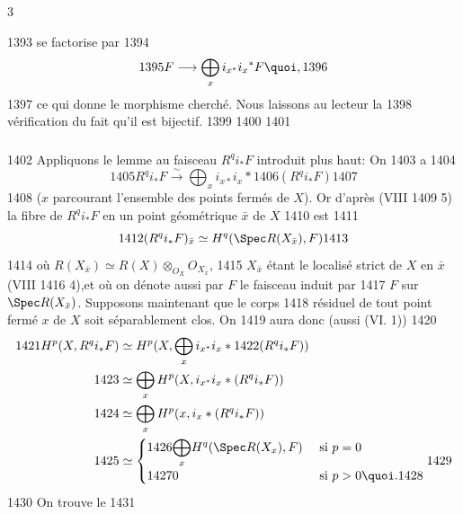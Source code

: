 3	\documentclass[10pt]{../fichiers-configuration-latex/smfart}
\begin{document}
  1393	se factorise par
  1394	$$
  1395	F\longrightarrow \bigoplus_x i_{x^{\ast}}i_x{}^\ast F{\quoi},
  1396	$$
  1397	ce qui donne le morphisme cherché. Nous laissons au lecteur la
  1398	vérification du fait qu'il est bijectif.
  1399	
  1400	\setcounter{subsection}{1}
  1401	\subsubsection{}
  1402	Appliquons le lemme au faisceau $R^qi_{\ast}F$ introduit plus haut: On
  1403	a
  1404	$$
  1405	R^qi_{\ast}F\xrightarrow{\sim} \bigoplus_x i_{x\ast} i_x \ast
  1406	(R^qi_{\ast}F)
  1407	$$
  1408	($x$ parcourant l'ensemble des points fermés de $X$). Or d'après (VIII
  1409	5) la fibre de $R^qi_{\ast}F$ en un point géométrique $\bar{x}$ de $X$
  1410	est
  1411	$$
  1412	(R^qi_{\ast}F)_{\bar{x}}\simeq H^q(\Spec R(X_{\bar{x}}), F)
  1413	$$
  1414	où $R(X_{\bar{x}})\simeq R(X)\otimes_{O_X}O_{X_{\bar{x}}}$,
  1415	$X_{\bar{x}}$ étant le localisé strict de $X$ en $\bar{x}$  (VIII
  1416	4),\pageoriginale et où on dénote aussi par $F$ le faisceau induit par
  1417	$F$ sur $\Spec R(X_{\bar{x}})$. Supposons maintenant que le corps
  1418	résiduel de tout point fermé $x$ de $X$ soit séparablement clos. On
  1419	aura donc (\cf aussi (VI. 1))
  1420	\begin{align*}
  1421	H^p(X,R^qi_{\ast}F) &\simeq H^p(X,\bigoplus_x i_{x^{\ast}}i_x\ast
  1422	(R^qi_{\ast}F))\\
  1423	&\simeq \bigoplus_x H^p(X, i_{x^{\ast}}i_x\ast(R^q i_{\ast}F))\\
  1424	&\simeq \bigoplus_x H^p(x,i_x\ast (R^q i_{\ast}F))\\
  1425	&\simeq \begin{cases}
  1426	         \displaystyle{\bigoplus_x} H^q(\Spec R(X_x),F) &\mbox{ si } p=0\\
  1427	          0                            &\mbox{ si } p>0{\quoi}.
  1428	         \end{cases}
  1429	\end{align*}
  1430	On trouve le
  1431	
\end{document}

